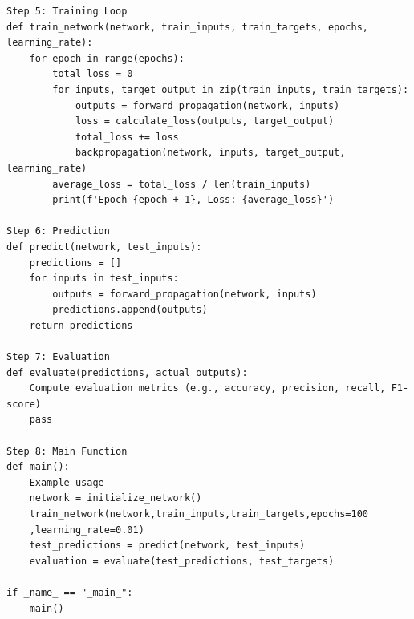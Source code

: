 \documentclass[12pt,a4paper]{report}
\begin{document}
\begin{verbatim}
Step 5: Training Loop
def train_network(network, train_inputs, train_targets, epochs, learning_rate):
    for epoch in range(epochs):
        total_loss = 0
        for inputs, target_output in zip(train_inputs, train_targets):
            outputs = forward_propagation(network, inputs)
            loss = calculate_loss(outputs, target_output)
            total_loss += loss
            backpropagation(network, inputs, target_output, learning_rate)
        average_loss = total_loss / len(train_inputs)
        print(f'Epoch {epoch + 1}, Loss: {average_loss}')

Step 6: Prediction
def predict(network, test_inputs):
    predictions = []
    for inputs in test_inputs:
        outputs = forward_propagation(network, inputs)
        predictions.append(outputs)
    return predictions

Step 7: Evaluation
def evaluate(predictions, actual_outputs):
    Compute evaluation metrics (e.g., accuracy, precision, recall, F1-score)
    pass

Step 8: Main Function
def main():
    Example usage
    network = initialize_network()
    train_network(network,train_inputs,train_targets,epochs=100
    ,learning_rate=0.01)
    test_predictions = predict(network, test_inputs)
    evaluation = evaluate(test_predictions, test_targets)

if _name_ == "_main_":
    main()
\end{verbatim}
\end{document}
